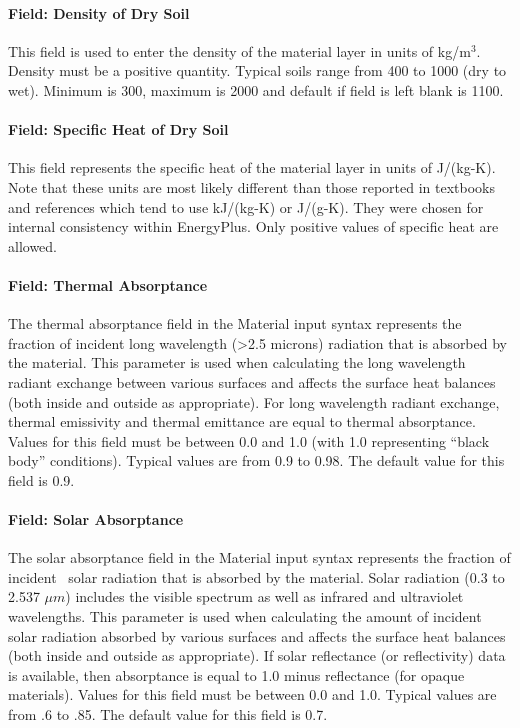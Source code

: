 \paragraph{Field: Density of Dry Soil}\label{field-density-of-dry-soil}

This field is used to enter the density of the material layer in units of kg/m\(^{3}\). Density must be a positive quantity. Typical soils range from 400 to 1000 (dry to wet). Minimum is 300, maximum is 2000 and default if field is left blank is 1100.

\paragraph{Field: Specific Heat of Dry Soil}\label{field-specific-heat-of-dry-soil}

This field represents the specific heat of the material layer in units of J/(kg-K). Note that these units are most likely different than those reported in textbooks and references which tend to use kJ/(kg-K) or J/(g-K). They were chosen for internal consistency within EnergyPlus. Only positive values of specific heat are allowed.

\paragraph{Field: Thermal Absorptance}\label{field-thermal-absorptance-2}

The thermal absorptance field in the Material input syntax represents the fraction of incident long wavelength (>2.5 microns) radiation that is absorbed by the material. This parameter is used when calculating the long wavelength radiant exchange between various surfaces and affects the surface heat balances (both inside and outside as appropriate). For long wavelength radiant exchange, thermal emissivity and thermal emittance are equal to thermal absorptance. Values for this field must be between 0.0 and 1.0 (with 1.0 representing ``black body'' conditions). Typical values are from 0.9 to 0.98. The default value for this field is 0.9.

\paragraph{Field: Solar Absorptance}\label{field-solar-absorptance-2}

The solar absorptance field in the Material input syntax represents the fraction of incident~ solar radiation that is absorbed by the material. Solar radiation (0.3 to 2.537 $\mu{}m$) includes the visible spectrum as well as infrared and ultraviolet wavelengths. This parameter is used when calculating the amount of incident solar radiation absorbed by various surfaces and affects the surface heat balances (both inside and outside as appropriate). If solar reflectance (or reflectivity) data is available, then absorptance is equal to 1.0 minus reflectance (for opaque materials). Values for this field must be between 0.0 and 1.0. Typical values are from .6 to .85. The default value for this field is 0.7.

